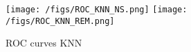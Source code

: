 \begin{figure}
\centering
\texttt{[image: /figs/ROC\_KNN\_NS.png]}
\texttt{[image: /figs/ROC\_KNN\_REM.png]}
\caption{\label{fig:KNN_roc} ROC curves KNN}
\end{figure}






    



